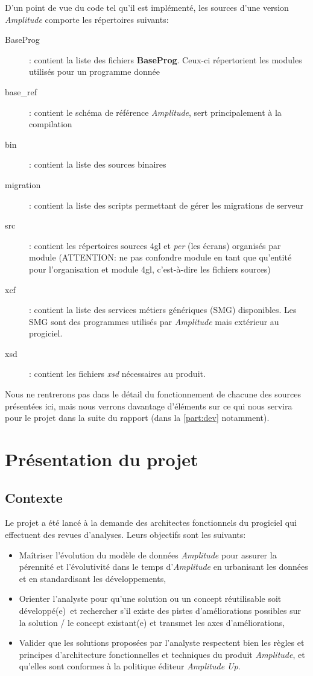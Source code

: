 \documentclass{polytech/polytech}
\begin{document}
D'un point de vue du code tel qu'il est implémenté, les sources d'une version \textit{Amplitude} comporte les répertoires suivants:

\begin{description}
	\item[BaseProg] : contient la liste des fichiers \textbf{BaseProg}. Ceux-ci répertorient les modules utilisés pour un programme donnée
	\item[base\_ref] : contient le schéma de référence \textit{Amplitude}, sert principalement à la compilation
	\item[bin] : contient la liste des sources binaires
	\item[migration] : contient la liste des scripts permettant de gérer les migrations de serveur
	\item[src] : contient les répertoires sources 4gl et \textit{per} (les écrans) organisés par module (ATTENTION: ne pas confondre module en tant que qu'entité pour l'organisation et module 4gl, c'est-à-dire les fichiers sources)
	\item[xcf] : contient la liste des services métiers génériques (SMG) disponibles. Les SMG sont des programmes utilisés par \textit{Amplitude} mais extérieur au progiciel.
	\item[xsd] : contient les fichiers \textit{xsd} nécessaires au produit.
\end{description}

Nous ne rentrerons pas dans le détail du fonctionnement de chacune des sources présentées ici, mais nous verrons davantage d'éléments sur ce qui nous servira pour le projet dans la suite du rapport (dans la \autoref{part:dev} notamment).

\chapter{Présentation du projet}

\section{Contexte}

Le projet a été lancé à la demande des architectes fonctionnels du progiciel qui effectuent des revues d'analyses. Leurs objectifs sont les suivants:

\begin{itemize}
	\item Maîtriser l’évolution du modèle de données \textit{Amplitude} pour assurer la pérennité et l’évolutivité dans le temps d’\textit{Amplitude} en urbanisant les données et en standardisant les développements,
	\item Orienter l’analyste pour qu’une solution ou un concept réutilisable soit développé(e) et rechercher s’il existe des pistes d’améliorations possibles sur la solution / le concept existant(e) et transmet les axes d’améliorations,
	\item Valider que les solutions proposées par l’analyste respectent bien les règles et principes d’architecture fonctionnelles et techniques du produit \textit{Amplitude}, et qu’elles sont conformes à la politique éditeur \textit{Amplitude Up}.
\end{itemize}
\end{document}

